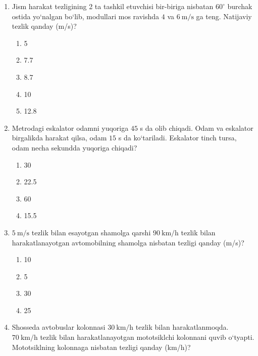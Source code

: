 \begin{enumerate}
\begin{enumerate}[label=\Alph*)]
\item 0.3
\item 0.9
\item 1.2
\item 1.5

\end{enumerate}


\item Jism harakat tezligining 2 ta tashkil etuvchisi bir-biriga nisbatan
$60^\circ$ burchak ostida yo‘nalgan bo‘lib, modullari mos ravishda
$4$ va $6\ \text{m/s}$ ga teng.
Natijaviy tezlik qanday (m/s)?

\begin{enumerate}[label=\Alph*)]
\item 5
\item 7.7
\item 8.7
\item 10
\item 12.8
\end{enumerate}


\item Metrodagi eskalator odamni yuqoriga $45$ s da olib chiqadi.
Odam va eskalator birgalikda harakat qilsa, odam $15$ s da ko‘tariladi.
Eskalator tinch tursa, odam necha sekundda yuqoriga chiqadi?

\begin{enumerate}[label=\Alph*)]
\item 30
\item 22.5
\item 60
\item 15.5

\end{enumerate}


\item $5\ \text{m/s}$ tezlik bilan esayotgan shamolga qarshi $90\ \text{km/h}$ tezlik bilan harakatlanayotgan avtomobilning
shamolga nisbatan tezligi qanday (m/s)?

\begin{enumerate}[label=\Alph*)]
\item 10
\item 5
\item 30
\item 25

\end{enumerate}


\item Shosseda avtobuslar kolonnasi $30\ \text{km/h}$ tezlik bilan harakatlanmoqda. $70\ \text{km/h}$ tezlik bilan harakatlanayotgan mototsiklchi kolonnani quvib o‘tyapti. Mototsiklning kolonnaga nisbatan tezligi qanday (km/h)?


\end{enumerate}
